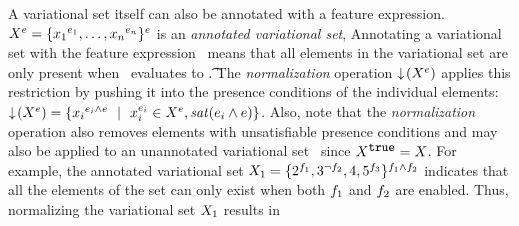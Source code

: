A variational set itself can also be annotated with a feature expression.
%
$\annot \vset = \setDef {\annot [\dimMeta_1] {\elem_1},\ldots,\annot [\dimMeta_n] {\elem_n}}^\dimMeta$ is an
\emph{annotated variational set}, 
Annotating a variational set with the feature expression \dimMeta\ means that all
elements in the variational set are only present when \dimMeta\ evaluates to \t.
The \emph{normalization} operation $\pushIn {\annot \vset}$ applies this
restriction by pushing it into the presence conditions of the individual
elements:
\ensuremath{
\pushIn {\annot \vset}
= 
\setDef{\annot [\dimMeta_i \wedge \dimMeta] {\elem_i} \myOR 
\annot [\dimMeta_i] \elem_i \in \annot \vset, \sat {\dimMeta_i \wedge \dimMeta}
}}.
Also, note that the \emph{normalization} operation also removes elements
with unsatisfiable presence conditions and may also be applied
to an unannotated variational set \vset\ since $\annot[\t]{\vset} = \vset$.
%
For example, the annotated variational set
$\vset_1 = \{\annot [\A] 2, \annot [\neg \B] 3, 4, \annot [\C] 5\}^{\A \wedge \B}$
indicates that all the elements of the set can only exist
when both $\A$ and $\B$ are enabled. Thus, normalizing the variational set $\vset_1$
results in

